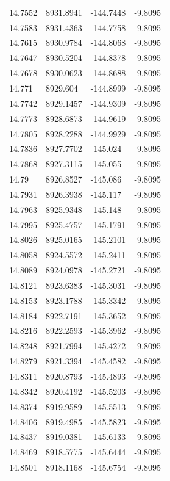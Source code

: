 \begin{table}[H]
\begin{tabular}{llll}
14.7552 & 8931.8941 & -144.7448 & -9.8095 \\
14.7583 & 8931.4363 & -144.7758 & -9.8095 \\
14.7615 & 8930.9784 & -144.8068 & -9.8095 \\
14.7647 & 8930.5204 & -144.8378 & -9.8095 \\
14.7678 & 8930.0623 & -144.8688 & -9.8095 \\
14.771 & 8929.604 & -144.8999 & -9.8095 \\
14.7742 & 8929.1457 & -144.9309 & -9.8095 \\
14.7773 & 8928.6873 & -144.9619 & -9.8095 \\
14.7805 & 8928.2288 & -144.9929 & -9.8095 \\
14.7836 & 8927.7702 & -145.024 & -9.8095 \\
14.7868 & 8927.3115 & -145.055 & -9.8095 \\
14.79 & 8926.8527 & -145.086 & -9.8095 \\
14.7931 & 8926.3938 & -145.117 & -9.8095 \\
14.7963 & 8925.9348 & -145.148 & -9.8095 \\
14.7995 & 8925.4757 & -145.1791 & -9.8095 \\
14.8026 & 8925.0165 & -145.2101 & -9.8095 \\
14.8058 & 8924.5572 & -145.2411 & -9.8095 \\
14.8089 & 8924.0978 & -145.2721 & -9.8095 \\
14.8121 & 8923.6383 & -145.3031 & -9.8095 \\
14.8153 & 8923.1788 & -145.3342 & -9.8095 \\
14.8184 & 8922.7191 & -145.3652 & -9.8095 \\
14.8216 & 8922.2593 & -145.3962 & -9.8095 \\
14.8248 & 8921.7994 & -145.4272 & -9.8095 \\
14.8279 & 8921.3394 & -145.4582 & -9.8095 \\
14.8311 & 8920.8793 & -145.4893 & -9.8095 \\
14.8342 & 8920.4192 & -145.5203 & -9.8095 \\
14.8374 & 8919.9589 & -145.5513 & -9.8095 \\
14.8406 & 8919.4985 & -145.5823 & -9.8095 \\
14.8437 & 8919.0381 & -145.6133 & -9.8095 \\
14.8469 & 8918.5775 & -145.6444 & -9.8095 \\
14.8501 & 8918.1168 & -145.6754 & -9.8095 \\

\end{tabular}
\end{table}
